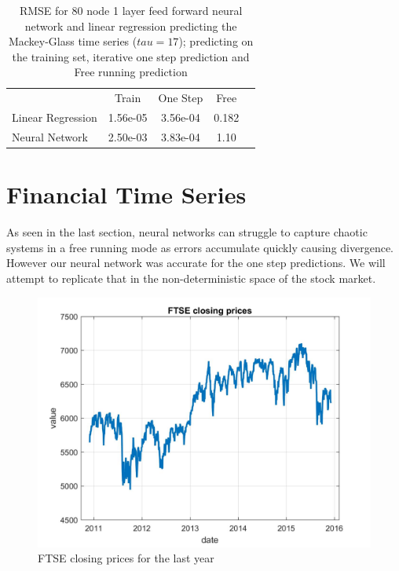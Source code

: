\documentclass[a4paper,10pt, twocolumn]{article}
\begin{document}
\begin{table}[b]
\begin{tabular}{l c|c|c|c}
	
	& Train & One Step & Free  \\
Linear Regression & 1.56e-05 & 3.56e-04 & 0.182 \\
Neural Network &  2.50e-03 & 3.83e-04 &  1.10 \\
\end{tabular}
\caption{RMSE for 80 node 1 layer feed forward neural network and linear regression predicting the Mackey-Glass time series ($tau =17$); predicting on the training set, iterative one step prediction and Free running prediction }
\end{table}

\section{Financial Time Series}
As seen in the last section, neural networks can struggle to capture chaotic systems in a free running mode as errors accumulate quickly causing divergence. However our neural network was accurate for the one step predictions. We will attempt to replicate that in the non-deterministic space of the stock market. 
\begin{figure}[ht]
	\includegraphics[width=0.9\linewidth]{FTSEclose.jpg}
	\centering
	\caption{ FTSE closing prices for the last year  }
		\label{fig:FTSEclose}
\end{figure}
\end{document}

